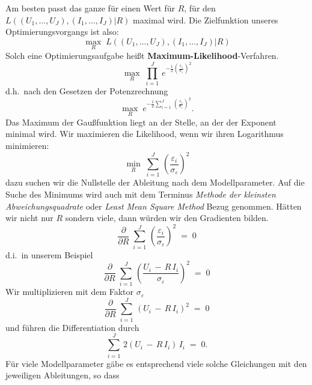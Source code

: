 Am besten passt das ganze für einen Wert für $R$,
für den $L((U_1,\dots, U_J), (I_1,\dots,I_J) | R)$ maximal wird.
Die Zielfunktion unseres Optimierungsvorgangs ist also:
\begin{equation}
\max_{R} \; L((U_1,\dots, U_J), (I_1,\dots,I_J) | R)
\end{equation}
Solch eine Optimierungsaufgabe heißt \textbf{Maximum-Likelihood}-Verfahren.
\begin{equation}
\max_{R} \; \prod\limits_{i = 1}^J \,  e^{-\frac{1}{2} \left(\frac{\varepsilon_i}{\sigma_\varepsilon}\right)^2}
\label{MaxiLikeR1}
\end{equation}
d.h.\ nach den Gesetzen der Potenzrechnung
\begin{equation}
\max_{R} \; e^{-\frac{1}{2} \sum\limits_{i = 1}^J \, \left(\frac{\varepsilon_i}{\sigma_\varepsilon}\right)^2} .
\label{MaxiLikeR2}
\end{equation}
Das Maximum der Gaußfunktion liegt an der Stelle, an der der Exponent minimal wird.
Wir maximieren die Likelihood, wenn wir ihren Logarithmus minimieren:
\begin{equation}
\min_{R} \; \sum_{i = 1}^J \, \left(\frac{\varepsilon_i}{\sigma_\varepsilon}\right)^2
\label{MaxiLikeLSQ}
\end{equation}
dazu suchen wir die Nullstelle der Ableitung nach dem Modellparameter.
Auf die Suche des Minimums wird auch mit dem Terminus \textsl{Methode der kleinsten Abweichungsquadrate} oder
\textsl{Least Mean Square Method} Bezug genommen.
Hätten wir nicht nur $R$ sondern viele,
dann würden wir den Gradienten bilden.
\begin{equation}
\frac{\partial}{\partial R} \; \sum_{i = 1}^J \, \left(\frac{\varepsilon_i}{\sigma_\varepsilon}\right)^2 \; = \; 0
\end{equation}
d.i.\ in unserem Beispiel
\begin{equation}
\frac{\partial}{\partial R} \; \sum_{i = 1}^J \, \left(\frac{U_i \, - \, R \, I_i}{\sigma_\varepsilon}\right)^2 \; = \; 0
\end{equation}
Wir multiplizieren mit dem Faktor $\sigma_\varepsilon$
\begin{equation}
\frac{\partial}{\partial R} \; \sum_{i = 1}^J \, \left(U_i \, - \, R \, I_i\right)^2 \; = \; 0
\end{equation}
und führen die Differentiation durch
\begin{equation}
\sum_{i = 1}^J \, 2 \left(U_i \, - \, R \, I_i\right) \, I_i \; = \; 0 .
\end{equation}
Für viele Modellparameter gäbe es entsprechend viele solche Gleichungen mit den jeweiligen Ableitungen, so dass
